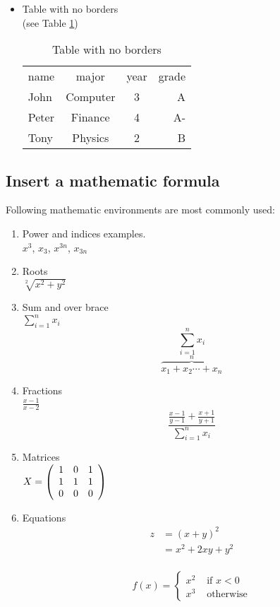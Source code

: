 \documentclass{article}
\begin{document}
\begin{itemize}
\item Table with no borders\\
(see Table \ref{Table})

\begin{table}[h]
 \centering
 \begin{tabular}{lccr}
 name & major & year & grade \\
 John & Computer & 3 & A \\
 Peter & Finance & 4 & A- \\
 Tony & Physics & 2 & B \\
 \end{tabular}
\caption{Table with  no borders}
\label{Table}
\end{table}
\end{itemize}
\subsection{Insert a mathematic formula}
Following mathematic environments are most commonly used:
\begin{enumerate}
\item Power and indices examples.\\
$x^3$, $x_3$, $x^{3n}$, $x_{3n}$

\item Roots\\
$\sqrt[2]{x^2 + y^2}$

\item Sum and over brace\\
$\sum_{i=1}^{n}x_i$
\[ \sum_{i=1}^{n}x_i \]
\[\overbrace{x_1+x_2\cdots + x_n}^{n}\]

\item Fractions \\
$\frac{x-1}{x-2}$
\[ \frac{\frac{x-1}{y-1}+\frac{x+1}{y+1}}{\sum_{i=1}^{n}x_i}\]

\item Matrices \\
$X = \left(
\begin{array}{c c c}
1 & 0 & 1\\
1 & 1 & 1\\
0 & 0 & 0 \\
\end{array}
\right)$

\item Equations \\
\begin{equation}
\begin{split}
z &= (x+y)^2\\
  &= x^2+2xy+y^2\\
\end{split}
\end{equation}

\begin{displaymath}
f(x) = \left\{
\begin{array}{rr}
x^2 &\mbox{ if $x<0$} \\
x^3 &\mbox{ otherwise}
\end{array} \right.
\end{displaymath}

\end{enumerate}
\end{document}
